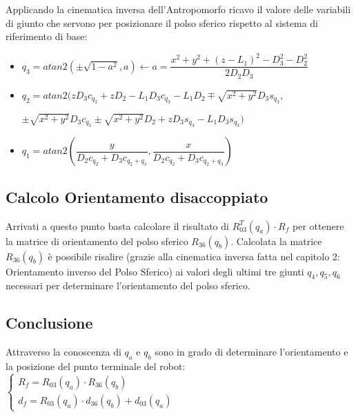 \documentclass[a4paper,12pt]{article}
\begin{document}
Applicando la cinematica inversa dell'Antropomorfo ricavo il valore delle variabili di giunto che servono per posizionare il polso sferico rispetto al sistema di riferimento di base:
\begin{itemize}
\item $q_3 = atan2(\pm\sqrt{1-a^2},a) \leftarrow a=\dfrac{x^2+y^2+(z-L_1)^2-D_3^2-D_2^2}{2D_2D_3}$
\item $q_2 = atan2(zD_3c_{q_3} + zD_2 - L_1D_3c_{q_3} - L_1D_2 \mp \sqrt{x^2+y^2}D_3s_{q_3},$

\hspace{20mm} $ \pm \sqrt{x^2+y^2}D_3c_{q_3} \pm \sqrt{x^2+y^2}D_2 + zD_3s_{q_3} - L_1D_3s_{q_3})$
\item $q_1 = atan2(\dfrac{y}{D_2c_{q_2}+D_3c_{q_2+q_3}},\dfrac{x}{D_2c_{q_2}+D_3c_{q_2+q_3}})$
\end{itemize}

\subsection{Calcolo Orientamento disaccoppiato}
Arrivati a questo punto basta calcolare il risultato di $ R_{03}^T(q_a) \cdot R_f $ per ottenere la matrice di orientamento del polso sferico $R_{36}(q_b)$. Calcolata la matrice $R_{36}(q_b)$ è possibile risalire (grazie alla cinematica inversa fatta nel capitolo 2: Orientamento inverso del Polso Sferico) ai valori degli ultimi tre giunti $q_4,q_5,q_6$ necessari per determinare l'orientamento del polso sferico.

\subsection{Conclusione}
Attraverso la conoscenza di $q_a$ e $q_b$ sono in grado di determinare l'orientamento e la posizione del punto terminale del robot:\\

		$\left\{ \begin{array} {ll} %
		R_f  = R_{03}(q_a) \cdot  R_{36}(q_b) \\
		d_f = R_{03}(q_a) \cdot d_{36}(q_b) + d_{03}(q_a)
		\end{array}
		\right.$
\end{document}
